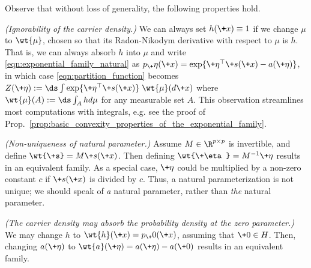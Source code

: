\documentclass{article} %
\newcommand{\obs}{\+x}
\newcommand{\normalizerFunction}{Z}
\newcommand{\logNormalizerFunction}{a}
\newcommand{\sufficientStatsFunction}{\+s}
\newcommand{\carrierDensity}{h}
\newcommand{\naturalParam}{\+\eta}
\newcommand{\naturalParamSpace}{H}
\begin{document}
\begin{remark}
Observe \cite{chua2019stats} that without loss of generality, the following properties hold. 
%
\begin{alphabate} 
\item \label{item:ignorabiity_of_carrier_density} \textit{(Ignorability of the carrier density.)} We can always set $\carrierDensity(\obs) \equiv 1$ if we change $\mu$ to $\wt{\mu}$, chosen so that its Radon-Nikodym derivative with respect to $\mu$ is $\carrierDensity$. That is, we can always absorb $\carrierDensity$ into $\mu$ and write \eqref{eqn:exponential_family_natural} as  $p_\naturalParam(\obs) = \exp \{ \naturalParam^\top \sufficientStatsFunction(\obs) - \logNormalizerFunction(\naturalParam)\}$, in which case \eqref{eqn:partition_function} becomes $\normalizerFunction(\naturalParam) := \ds\int  \exp \{ \naturalParam^\top \sufficientStatsFunction(\obs)  \} \; \wt{\mu} (d\obs) $ where $\wt{\mu}(A) := \ds\int_A \carrierDensity d\mu$ for any measurable set $A$.   This observation streamlines most computations with integrals, e.g. see the proof of Prop.~\ref{prop:basic_convexity_properties_of_the_exponential_family}. 
\item \label{item:nonuniqueness_of_natural_parameter} \textit{(Non-uniqueness of natural parameter.)} Assume $M \in \R^{p \times p}$ is invertible, and define $\wt{\sufficientStatsFunction} = M \sufficientStatsFunction(\obs)$. Then defining $\wt{\naturalParam} = M^{-1} \naturalParam$ results in an equivalent family.  As a special case, $\naturalParam$ could be multiplied by a non-zero constant $c$ if $\sufficientStatsFunction(\obs)$ is divided by $c$.  Thus, a natural parameterization is not unique; we should speak of \textit{a} natural parameter,  rather than \textit{the} natural parameter.
\item \textit{(The carrier density may absorb the probability density at the zero parameter.)} We may change $\carrierDensity$ to $\wt{\carrierDensity}(\obs) = p_\+0(\obs)$, assuming that $\+0 \in \naturalParamSpace$.  Then, changing $\logNormalizerFunction(\naturalParam)$ to $\wt{\logNormalizerFunction}(\naturalParam) = \logNormalizerFunction(\naturalParam) - \logNormalizerFunction(\+0)$ results in an equivalent family.
\end{alphabate}
\label{rk:alternate_constructions_for_the_exponential_family}
\end{remark}
\end{document}

